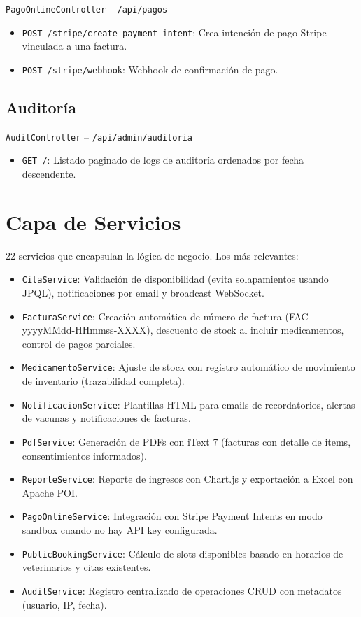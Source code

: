 \texttt{PagoOnlineController} -- \texttt{/api/pagos}
\begin{itemize}
    \item \texttt{POST /stripe/create-payment-intent}: Crea intenci\'on de pago Stripe vinculada a una factura.
    \item \texttt{POST /stripe/webhook}: Webhook de confirmaci\'on de pago.
\end{itemize}

\subsection{Auditor\'ia}

\texttt{AuditController} -- \texttt{/api/admin/auditoria}
\begin{itemize}
    \item \texttt{GET /}: Listado paginado de logs de auditor\'ia ordenados por fecha descendente.
\end{itemize}

\section{Capa de Servicios}

22 servicios que encapsulan la l\'ogica de negocio. Los m\'as relevantes:

\begin{itemize}
    \item \texttt{CitaService}: Validaci\'on de disponibilidad (evita solapamientos usando JPQL), notificaciones por email y broadcast WebSocket.
    \item \texttt{FacturaService}: Creaci\'on autom\'atica de n\'umero de factura (FAC-yyyyMMdd-HHmmss-XXXX), descuento de stock al incluir medicamentos, control de pagos parciales.
    \item \texttt{MedicamentoService}: Ajuste de stock con registro autom\'atico de movimiento de inventario (trazabilidad completa).
    \item \texttt{NotificacionService}: Plantillas HTML para emails de recordatorios, alertas de vacunas y notificaciones de facturas.
    \item \texttt{PdfService}: Generaci\'on de PDFs con iText 7 (facturas con detalle de items, consentimientos informados).
    \item \texttt{ReporteService}: Reporte de ingresos con Chart.js y exportaci\'on a Excel con Apache POI.
    \item \texttt{PagoOnlineService}: Integraci\'on con Stripe Payment Intents en modo sandbox cuando no hay API key configurada.
    \item \texttt{PublicBookingService}: C\'alculo de slots disponibles basado en horarios de veterinarios y citas existentes.
    \item \texttt{AuditService}: Registro centralizado de operaciones CRUD con metadatos (usuario, IP, fecha).
\end{itemize}

